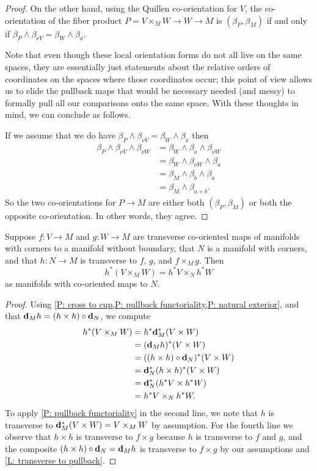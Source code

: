 \begin{proof}
	On the other hand, using the Quillen co-orientation for $V$, the co-orientation of the fiber product $P = V \times_M W \to W \to M$ is $(\beta_P,\beta_M)$ if and only if $\beta_P \wedge \beta_{\nu V} = \beta_W \wedge \beta_a$.

	Note that even though these local orientation forms do not all live on the same spaces, they are essentially just statements about the relative orders of coordinates on the spaces where those coordinates occur; this point of view allows us to elide the pullback maps that would be necessary needed (and messy) to formally pull all our comparisons onto the same space.
	With these thoughts in mind, we can conclude as follows.

	If we assume that we do have $\beta_P \wedge \beta_{\nu V} = \beta_W \wedge \beta_a$ then
	\begin{align*}
		\beta_P \wedge \beta_{\nu V} \wedge \beta_{\nu W}& = \beta_W \wedge \beta_a \wedge \beta_{\nu W}\\
		& = \beta_W \wedge \beta_{\nu W} \wedge \beta_a\\
		& = \beta_M \wedge \beta_b \wedge \beta_a\\
		& = \beta_M \wedge \beta_{a+b}.
	\end{align*}
	So the two co-orientations for $P \to M$ are either both $(\beta_P,\beta_M)$ or both the opposite co-orientation.
	In other words, they agree.
\end{proof}

\begin{corollary}\label{C: fiber natural pullback}
	Suppose $f \colon V \to M$ and $g \colon W \to M$ are transverse co-oriented maps of manifolds with corners to a manifold without boundary, that $N$ is a manifold with corners, and that $h \colon N \to M$ is transverse to $f$, $g$, and $f \times_M g$.
	Then
	$$h^*(V \times_M W) = h^*V \times_N h^*W$$
	as manifolds with co-oriented maps to $N$.
\end{corollary}
\begin{proof}
	Using \cref{P: cross to cup,P: pullback functoriality,P: natural exterior}, and that $\mathbf{d}_M h = (h \times h) \circ \mathbf{d}_N$,
	we compute
	\begin{align*}
		h^*(V \times_M W)& = h^*\mathbf{d}_M^*(V \times W)\\
		& = (\mathbf{d}_M h)^*(V \times W)\\
		& = ((h \times h) \circ \mathbf{d}_N)^*(V \times W)\\
		& = \mathbf{d}_N^*(h \times h)^*(V \times W)\\
		& = \mathbf{d}_N^*(h^*V \times h^*W)\\
		& = h^*V \times_N h^*W.
	\end{align*}
	To apply \cref{P: pullback functoriality} in the second line, we note that $h$ is transverse to $\mathbf{d}_M^*(V \times W) = V \times_M W$ by assumption.
	For the fourth line we observe that $h \times h$ is transverse to $f \times g$ because $h$ is transverse to $f$ and $g$, and the composite $(h \times h) \circ \mathbf{d}_N = \mathbf{d}_M h$ is transverse to $f \times g$ by our assumptions and \cref{L: transverse to pullback}.
\end{proof}

